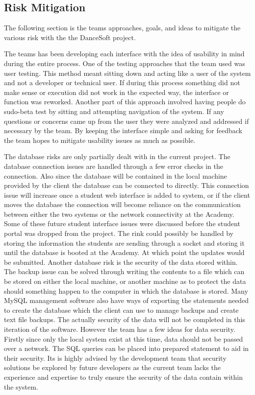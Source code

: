 \subsection{Risk Mitigation}
The following section is the teams approaches, goals, and ideas to mitigate the various risk with the the DanceSoft project.

The teams has been developing each interface with the idea of usability in mind during the entire process. One of the testing approaches that the team used was user testing. This method meant sitting down and acting like a user of the system and not a developer or technical user. If during this process something did not make sense or execution did not work in the expected way, the interface or function was reworked. Another part of this approach involved having people do sudo-beta test by sitting and attempting navigation of the system. If any questions or concerns came up from the user they were analyzed and addressed if necessary by the team. By keeping the interface simple and asking for feedback the team hopes to mitigate usability issues as much as possible.

The database risks are only partially dealt with in the current project. The database connection issues are handled through a few error checks in the connection. Also since the database will be contained in the local machine provided by the client the database can be connected to directly. This connection issue will increase once a student web interface is added to system, or if the client moves the database the connection will become reliance on the communication between either the two systems or the network connectivity at the Academy. Some of these future student interface issues were discussed before the student portal was dropped from the project. The rink could possibly be handled by storing the information the students are sending through a socket and storing it until the database is booted at the Academy. At which point the updates would be submitted.
Another database risk is the security of the data stored within. The backup issue can be solved through writing the contents to a file which can be stored on either the local machine, or another machine as to protect the data should something happen to the computer in which the database is stored. Many MySQL management software also have ways of exporting the statements needed to create the database which the client can use to manage backups and create text file backups. The actually security of the data will not be completed in this iteration of the software. However the team has a few ideas for data security. Firstly since only the local system exist at this time, data should not be passed over a network. The SQL queries can be placed into prepared statement to aid in their security. Its is highly advised by the development team that security solutions be explored by future developers as the current team lacks the experience and expertise to truly ensure the security of the data contain within the system.

